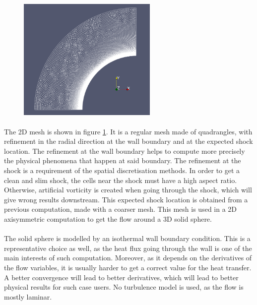 
        \begin{figure}
          \centering
          \includegraphics[width=0.6\textwidth]{figures/sphere_mesh.png}
          \caption{}
          \label{fig:sphere_mesh}
        \end{figure}

        \paragraph{}
        The 2D mesh is shown in figure \ref{fig:sphere_mesh}.
        It is a regular mesh made of quadrangles, with refinement in the radial direction at the wall boundary and at the expected shock location.
        The refinement at the wall boundary helps to compute more precisely the physical phenomena that happen at said boundary.
        The refinement at the shock is a requirement of the spatial discretisation methods.
        In order to get a clean and slim shock, the cells near the shock must have a high aspect ratio.
        Otherwise, artificial vorticity is created when going through the shock, which will give wrong results downstream. 
        This expected shock location is obtained from a previous computation, made with a coarser mesh.
        This mesh is used in a 2D axisymmetric computation to get the flow around a 3D solid sphere.

        \paragraph{}
        The solid sphere is modelled by an isothermal wall boundary condition.
        This is a representative choice as well, as the heat flux going through the wall is one of the main interests of such computation.
        Moreover, as it depends on the derivatives of the flow variables, it is usually harder to get a correct value for the heat transfer.
        A better convergence will lead to better derivatives, which will lead to better physical results for such case users.
        No turbulence model is used, as the flow is mostly laminar.

